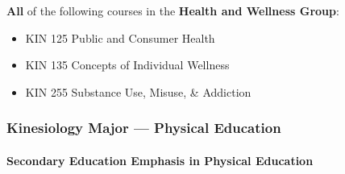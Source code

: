 \documentclass[
  letterpaper,
]{scrbook}
\providecommand{\tightlist}{%
  \setlength{\itemsep}{0pt}\setlength{\parskip}{0pt}}
\let\oldparagraph\paragraph
\renewcommand{\paragraph}[1]{\oldparagraph{#1}\mbox{}}
\begin{document}
\begin{enumerate}
  \textbf{All} of the following courses in the \textbf{Health and
  Wellness Group}:

  \begin{itemize}
  \tightlist
  \item
    KIN 125 Public and Consumer Health\\
  \item
    KIN 135 Concepts of Individual Wellness\\
  \item
    KIN 255 Substance Use, Misuse, \& Addiction
  \end{itemize}
\end{enumerate}

\subsubsection{Kinesiology Major --- Physical
Education}\label{kinesiology-major-physical-education}

\paragraph{Secondary Education Emphasis in Physical
Education}\label{secondary-education-emphasis-in-physical-education}
\end{document}
